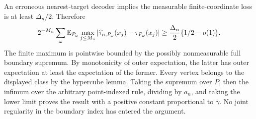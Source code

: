 An erroneous nearest-target decoder implies the measurable finite-coordinate loss is at least \(\Delta_n/2\).  Therefore
\[
 2^{-M_n}\sum_\omega
 \mathbb E_{P_\omega}\max_{j\leq M_n}
 |\widehat\tau_{n,P_\omega}(x_j)-\tau_{P_\omega}(x_j)|
 \geq {\Delta_n\over2}\{1/2-o(1)\}.
\]
The finite maximum is pointwise bounded by the possibly nonmeasurable full boundary supremum.  By monotonicity of outer expectation, the latter has outer expectation at least the expectation of the former.  Every vertex belongs to the displayed class by the hypercube lemma.  Taking the supremum over \(P\), then the infimum over the arbitrary point-indexed rule, dividing by \(a_n\), and taking the lower limit proves the result with a positive constant proportional to \(\gamma\).  No joint regularity in the boundary index has entered the argument.
